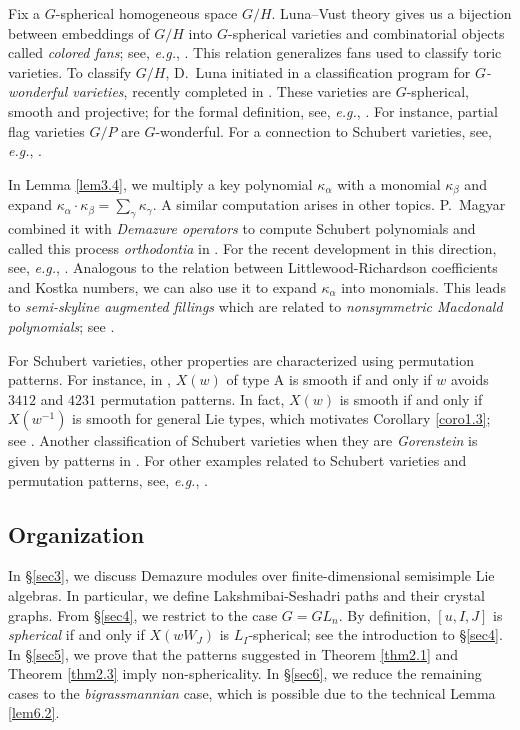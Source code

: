 \documentclass[12pt]{amsart}
\theoremstyle{definition}
\theoremstyle{remark}
\begin{document}
Fix a $G$-spherical homogeneous space $G/H$. Luna--Vust theory gives us a bijection between embeddings of $G/H$ into $G$-spherical varieties and combinatorial objects called \textit{colored fans}; see, \textit{e.g.}, \cite[Theorem 3.1.7]{MR3177371}. This relation generalizes fans used to classify toric varieties. To classify $G/H$, D.~Luna initiated in \cite{MR1896179} a classification program for \textit{$G$-wonderful varieties}, recently completed in \cite[Theorem 1.2.3]{MR3473657}. These varieties are $G$-spherical, smooth and projective; for the formal definition, see, \textit{e.g.}, \cite[\S 3.4.4]{MR3177371}. For instance, partial flag varieties $G/P$ are $G$-wonderful. For a connection to Schubert varieties, see, \textit{e.g.}, \cite[Theorem 1.5]{MR4643501}.

In Lemma \ref{lem3.4}, we multiply a key polynomial $\kappa_\alpha$ with a monomial $\kappa_\beta$ and expand $\kappa_\alpha \cdot \kappa_\beta = \sum_\gamma \kappa_\gamma$. A similar computation arises in other topics. P.~Magyar combined it with \textit{Demazure operators} to compute Schubert polynomials and called this process \textit{orthodontia} in \cite{MR1617793}. For the recent development in this direction, see, \textit{e.g.}, \cite{MR4369248}. Analogous to the relation between Littlewood-Richardson coefficients and Kostka numbers, we can also use it to expand $\kappa_\alpha$ into monomials. This leads to \textit{semi-skyline augmented fillings} which are related to \textit{nonsymmetric Macdonald polynomials}; see \cite{MR2496309}.

For Schubert varieties, other properties are characterized using permutation patterns. For instance, in \cite{MR1051089}, $X(w)$ of type A is smooth if and only if $w$ avoids $3412$ and $4231$ permutation patterns. In fact, $X(w)$ is smooth if and only if $X(w^{-1})$ is smooth for general Lie types, which motivates Corollary \ref{coro1.3}; see \cite{MR2827039}. Another classification of Schubert varieties when they are \textit{Gorenstein} is given by patterns in \cite{MR2264071}. For other examples related to Schubert varieties and permutation patterns, see, \textit{e.g.}, \cite{MR3012380}.



\subsection{Organization}

In \S \ref{sec3}, we discuss Demazure modules over finite-dimensional semisimple Lie algebras. In particular, we define Lakshmibai-Seshadri paths and their crystal graphs. From \S \ref{sec4}, we restrict to the case $G =GL_n$. By definition, $[u,I,J]$ is \textit{spherical} if and only if $X(wW_J)$ is $L_I$-spherical; see the introduction to \S \ref{sec4}. In \S \ref{sec5}, we prove that the patterns suggested in Theorem \ref{thm2.1} and Theorem \ref{thm2.3} imply non-sphericality. In \S \ref{sec6}, we reduce the remaining cases to the \textit{bigrassmannian} case, which is possible due to the technical Lemma \ref{lem6.2}.
\end{document}
